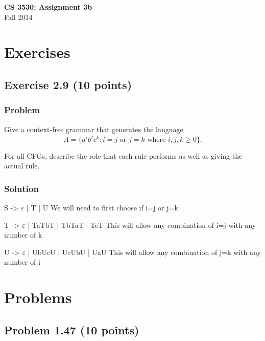 \documentclass{article}
\begin{document}
\begin{empfile}

\begin{center}
\textbf{\Large CS 3530: Assignment 3b} \\[2mm]
Fall 2014
\end{center}

\raggedright

\section*{Exercises}

\subsection*{Exercise 2.9 (10 points)}

\subsubsection*{Problem}

Give a context-free grammar that generates the language
$$
A=\{a^ib^jc^k:i=j\text{ or }j=k\text{ where }i,j,k\geq 0\}.
$$

For all CFGs, describe the role that each rule performs as well as
giving the actual rule.

\subsubsection*{Solution}

\setlength{\parindent}{89pt}

{\noindent S -> $\varepsilon$ | T | U}  {\indent We will need to first 
choose if i=j or j=k} 

\setlength{\parindent}{11pt} 

{\noindent T -> $\varepsilon$ | TaTbT | TbTaT | TcT} {\indent This will allow any 
combination of i=j with any number of k}

\setlength{\parindent}{7pt} 

{\noindent U -> $\varepsilon$ | UbUcU | UcUbU | UaU} {\indent This will allow any 
combination of j=k with any number of i}

\setlength{\parindent}{0pt}

\section*{Problems}

\subsection*{Problem 1.47 (10 points)}


\end{empfile}
\end{document}
